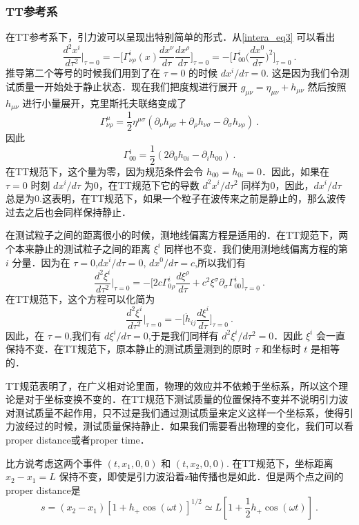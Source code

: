 \subsubsection{TT参考系}
在TT参考系下，引力波可以呈现出特别简单的形式．从\autoref{intera_eq3} 可以看出
\begin{equation}
\frac{d^2 x^i}{d\tau^2} \bigg|_{\tau = 0} = - \bigg[ \Gamma^i_{\nu\rho} (x) \frac{dx^\nu}{d\tau} \frac{dx^\rho}{d\tau} \bigg]_{\tau = 0} = - \bigg[ \Gamma^i_{00} \bigg( \frac{dx^0}{d\tau} \bigg)^2 \bigg]_{\tau = 0}~.
\end{equation}
推导第二个等号的时候我们用到了在 $\tau = 0$ 的时候 $dx^i/d\tau = 0$. 这是因为我们令测试质量一开始处于静止状态．现在我们把度规进行展开 $g_{\mu\nu} = \eta_{\mu\nu} + h_{\mu\nu}$ 然后按照 $h_{\mu\nu}$ 进行小量展开，克里斯托夫联络变成了
\begin{equation}
\Gamma^\mu_{\nu\rho} = \frac{1}{2} \eta^{\mu\sigma} (\partial_\nu h_{\rho\sigma} + \partial_\rho h_{\nu\sigma} - \partial_{\sigma} h_{\nu\rho}  )~. 
\end{equation}
因此
\begin{equation}
\Gamma^i_{00} = \frac{1}{2} (2\partial_0 h_{0i} - \partial_i h_{00}) ~.
\end{equation}
在TT规范下，这个量为零，因为规范条件会令 $h_{00} = h_{0i} = 0$．因此，如果在 $\tau = 0$ 时刻 $dx^i/d\tau$ 为0，在TT规范下它的导数 $d^2 x^i/d\tau^2$ 同样为0，因此，$dx^i/d\tau$ 总是为0.这表明，在TT规范下，如果一个粒子在波传来之前是静止的，那么波传过去之后也会同样保持静止．

在测试粒子之间的距离很小的时候，测地线偏离方程是适用的．在TT规范下，两个本来静止的测试粒子之间的距离 $\xi^i$ 同样也不变．我们使用测地线偏离方程的第 $i$ 分量．因为在 $\tau = 0$,$dx^i/d\tau = 0$, $dx^0/d\tau = c$,所以我们有
\begin{equation}
\frac{d^2\xi^i}{d\tau^2} \bigg|_{\tau = 0} = - \bigg[ 2 c \Gamma^i_{0\rho} \frac{d\xi^\rho}{d\tau} + c^2 \xi^\sigma \partial_\sigma \Gamma^i_{00} \bigg]_{\tau = 0}~.
\end{equation}
在TT规范下，这个方程可以化简为
\begin{equation}
\frac{d^2\xi^i}{d\tau^2}\bigg|_{\tau = 0} = - \bigg[ \dot{h}_{ij} \frac{d\xi^i}{d\tau} \bigg]_{\tau = 0}~. 
\end{equation}
因此，在 $\tau = 0$,我们有 $d\xi^i/d\tau = 0$,于是我们同样有 $d^2\xi^i/d\tau^2 = 0$．因此 $\xi^i$ 会一直保持不变．在TT规范下，原本静止的测试质量测到的原时 $\tau$ 和坐标时 $t$ 是相等的．

TT规范表明了，在广义相对论里面，物理的效应并不依赖于坐标系，所以这个理论是对于坐标变换不变的．在TT规范下测试质量的位置保持不变并不说明引力波对测试质量不起作用，只不过是我们通过测试质量来定义这样一个坐标系，使得引力波经过的时候，测试质量保持静止．如果我们需要看出物理的变化，我们可以看proper distance或者proper time．

比方说考虑这两个事件 $(t,x_1,0,0)$ 和 $(t,x_2,0,0)$. 在TT规范下，坐标距离 $x_2-x_1=L$ 保持不变，即使是引力波沿着z轴传播也是如此．但是两个点之间的proper distance是
\begin{equation}
s = (x_2-x_1)[1+h_+\cos(\omega t)]^{1/2} \simeq L[1+\frac{1}{2} h_+ \cos(\omega t) ] ~.
\end{equation}




